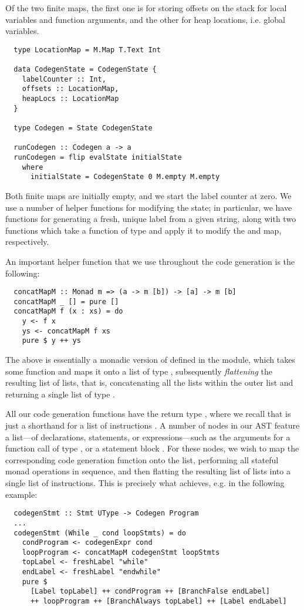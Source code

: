 Of the two finite maps, the first one is for storing offsets on the stack for
local variables and function arguments, and the other for heap locations, i.e.
global variables.

\begin{verbatim}
  type LocationMap = M.Map T.Text Int

  data CodegenState = CodegenState {
    labelCounter :: Int,
    offsets :: LocationMap,
    heapLocs :: LocationMap
  }

  type Codegen = State CodegenState

  runCodegen :: Codegen a -> a
  runCodegen = flip evalState initialState
    where
      initialState = CodegenState 0 M.empty M.empty
\end{verbatim}

Both finite maps are initially empty, and we start the label counter at zero.
We use a number of helper functions for modifying the state; in particular, we
have functions for generating a fresh, unique label from a given string, along
with two functions which take a function of type
 and apply it to modify the
 and  map, respectively.

An important helper function that we use throughout the code generation is the
following:
\begin{verbatim}
  concatMapM :: Monad m => (a -> m [b]) -> [a] -> m [b]
  concatMapM _ [] = pure []
  concatMapM f (x : xs) = do
    y <- f x
    ys <- concatMapM f xs
    pure $ y ++ ys
\end{verbatim}
%
The above is essentially a monadic version of
 defined in the 
module, which takes some function  and maps it onto a
list of type \haskell{[a]}, subsequently \emph{flattening} the resulting
list of lists, that is, concatenating all the lists within the outer list and
returning a single list of type \haskell{[b]}.

All our code generation functions have the return type ,
where we recall that  is just a shorthand for a list of
instructions \haskell{[Instr]}.
A number of nodes in our AST feature a list---of declarations, statements,
or expressions---such as the arguments for a function call of type
, or a statement block .
For these nodes, we wish to map the corresponding code generation function onto
the list, performing all stateful monad operations in sequence, and then
flatting the resulting list of lists into a single list of instructions.
This is precisely what  achieves, e.g. in the following
example:
%
\begin{verbatim}
  codegenStmt :: Stmt UType -> Codegen Program
  ...
  codegenStmt (While _ cond loopStmts) = do
    condProgram <- codegenExpr cond
    loopProgram <- concatMapM codegenStmt loopStmts
    topLabel <- freshLabel "while"
    endLabel <- freshLabel "endwhile"
    pure $
      [Label topLabel] ++ condProgram ++ [BranchFalse endLabel]
      ++ loopProgram ++ [BranchAlways topLabel] ++ [Label endLabel]
\end{verbatim}


